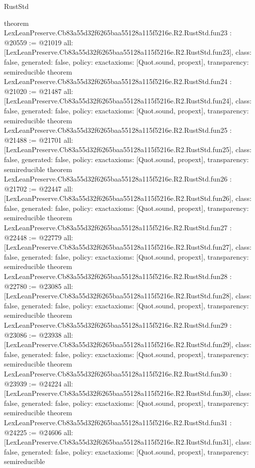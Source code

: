 \begin{lexlean}{RustStd}
\begin{coremodule}
{}
theorem LexLeanPreserve.Cb83a55d32f6265baa55128a115f5216e.R2.RustStd.fun23 : @20559 := @21019 {
  all: [LexLeanPreserve.Cb83a55d32f6265baa55128a115f5216e.R2.RustStd.fun23],
  class: false,
  generated: false,
  policy: exact{axioms: [Quot.sound, propext]},
  transparency: semireducible
}
theorem LexLeanPreserve.Cb83a55d32f6265baa55128a115f5216e.R2.RustStd.fun24 : @21020 := @21487 {
  all: [LexLeanPreserve.Cb83a55d32f6265baa55128a115f5216e.R2.RustStd.fun24],
  class: false,
  generated: false,
  policy: exact{axioms: [Quot.sound, propext]},
  transparency: semireducible
}
theorem LexLeanPreserve.Cb83a55d32f6265baa55128a115f5216e.R2.RustStd.fun25 : @21488 := @21701 {
  all: [LexLeanPreserve.Cb83a55d32f6265baa55128a115f5216e.R2.RustStd.fun25],
  class: false,
  generated: false,
  policy: exact{axioms: [Quot.sound, propext]},
  transparency: semireducible
}
theorem LexLeanPreserve.Cb83a55d32f6265baa55128a115f5216e.R2.RustStd.fun26 : @21702 := @22447 {
  all: [LexLeanPreserve.Cb83a55d32f6265baa55128a115f5216e.R2.RustStd.fun26],
  class: false,
  generated: false,
  policy: exact{axioms: [Quot.sound, propext]},
  transparency: semireducible
}
theorem LexLeanPreserve.Cb83a55d32f6265baa55128a115f5216e.R2.RustStd.fun27 : @22448 := @22779 {
  all: [LexLeanPreserve.Cb83a55d32f6265baa55128a115f5216e.R2.RustStd.fun27],
  class: false,
  generated: false,
  policy: exact{axioms: [Quot.sound, propext]},
  transparency: semireducible
}
theorem LexLeanPreserve.Cb83a55d32f6265baa55128a115f5216e.R2.RustStd.fun28 : @22780 := @23085 {
  all: [LexLeanPreserve.Cb83a55d32f6265baa55128a115f5216e.R2.RustStd.fun28],
  class: false,
  generated: false,
  policy: exact{axioms: [Quot.sound, propext]},
  transparency: semireducible
}
theorem LexLeanPreserve.Cb83a55d32f6265baa55128a115f5216e.R2.RustStd.fun29 : @23086 := @23938 {
  all: [LexLeanPreserve.Cb83a55d32f6265baa55128a115f5216e.R2.RustStd.fun29],
  class: false,
  generated: false,
  policy: exact{axioms: [Quot.sound, propext]},
  transparency: semireducible
}
theorem LexLeanPreserve.Cb83a55d32f6265baa55128a115f5216e.R2.RustStd.fun30 : @23939 := @24224 {
  all: [LexLeanPreserve.Cb83a55d32f6265baa55128a115f5216e.R2.RustStd.fun30],
  class: false,
  generated: false,
  policy: exact{axioms: [Quot.sound, propext]},
  transparency: semireducible
}
theorem LexLeanPreserve.Cb83a55d32f6265baa55128a115f5216e.R2.RustStd.fun31 : @24225 := @24606 {
  all: [LexLeanPreserve.Cb83a55d32f6265baa55128a115f5216e.R2.RustStd.fun31],
  class: false,
  generated: false,
  policy: exact{axioms: [Quot.sound, propext]},
  transparency: semireducible
}
\end{coremodule}
\end{lexlean}
